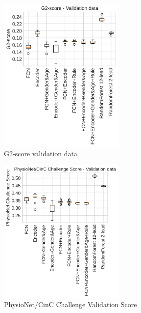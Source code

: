 \begin{figure}
    \centering
    \includegraphics[width=0.55\textwidth]{Figures/G2_score_val.png}
    \caption{G2-score validation data}
    \label{fig:my_label}
\end{figure}

\begin{figure}[]
    \centering
    \includegraphics[width=0.55\textwidth]{Figures/PhysioNetChallenge_score_val.png}
    \caption{PhysioNet/CinC Challenge Validation Score}
    \label{fig:my_label}
\end{figure}